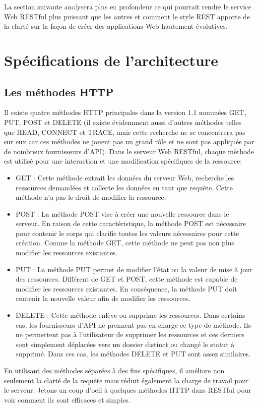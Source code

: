 La section suivante analysera plus en profondeur ce qui pourrait rendre le service Web RESTful plus puissant que les autres et comment le style REST apporte de la clarté sur la façon de créer des applications Web hautement évolutives.
\section{Spécifications de l'architecture}
\subsection{Les méthodes HTTP}
Il existe quatre méthodes HTTP principales dans la version 1.1 nommées GET, PUT, POST et DELETE (il existe évidemment aussi d'autres méthodes telles que HEAD, CONNECT et TRACE, mais cette recherche ne se concentrera pas sur eux car ces méthodes ne jouent pas un grand rôle et ne sont pas appliqués par de nombreux fournisseurs d'API). Dans le serveur Web RESTful, chaque méthode est utilisé pour une interaction et une modification spécifiques de la ressource:

\begin{itemize}
\item GET : Cette méthode extrait les données du serveur Web, recherche les ressources demandées et collecte les données en tant que requête. Cette méthode n'a pas le droit de modifier la ressource.
\item POST : La méthode POST vise à créer une nouvelle ressource dans le serveur. En raison de cette caractéristique, la méthode POST est nécessaire pour contenir le corps qui clarifie toutes les valeurs nécessaires pour cette création. Comme la méthode GET, cette méthode ne peut pas non plus modifier les ressources existantes.
\item PUT : La méthode PUT permet de modifier l'état ou la valeur de mise à jour des ressources. Différent de GET et POST, cette méthode est capable de modifier les ressources existantes. En conséquence, la méthode PUT doit contenir la nouvelle valeur afin de modifier les ressources.
\item DELETE : Cette méthode enlève ou supprime les ressources. Dans certains cas, les fournisseurs d'API ne prennent pas en charge ce type de méthode. Ils ne permettent pas à l'utilisateur de supprimer les ressources et ces derniers sont simplement déplacées vers un dossier distinct ou changé le statut à supprimé. Dans ces cas, les méthodes DELETE et PUT sont assez similaires.

\end{itemize}
En utilisant des méthodes séparées à des fins spécifiques, il améliore non seulement la clarté de la requête mais réduit également la charge de travail pour le serveur. Jetons un coup d'oeil à quelques méthodes HTTP dans RESTful pour voir comment ils sont efficaces et simples.

